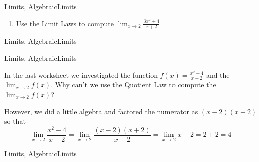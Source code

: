 \begin{tagblock}{Limits, AlgebraicLimits}
\begin{question}
\begin{enumerate}
\vspace{2in}

\item Use the Limit Laws to compute $\displaystyle \lim_{x \to 2} \frac{3x^2+4}{x+2}$  
\end{enumerate}
	
	
\begin{tags}
	    Limits, AlgebraicLimits
\end{tags}
	
\begin{diary}
	    
\end{diary}
	
\begin{solution}
	  
\end{solution}
	
\end{question}

\end{tagblock}



\begin{tagblock}{Limits, AlgebraicLimits}
\begin{question}
	In the last worksheet we investigated the function $\displaystyle f(x) = \frac{x^2-4}{x-2}$ and the $\lim_{x \to 2} f(x)$.  
Why can't we use the Quotient Law to compute the  $\lim_{x \to 2} f(x)$?  

\vspace{1in}

 However, we did a little algebra and factored the numerator as $(x-2)(x+2)$ so that
 \[ \lim_{x \to 2} \frac{x^2-4}{x-2} =  \lim_{x \to 2} \frac{(x-2)(x+2)}{x-2} = \lim_{x \to 2} x+2 = 2+2 = 4 \]
	
	
\begin{tags}
	    Limits, AlgebraicLimits
\end{tags}
	
\begin{diary}
	    
\end{diary}
	
\begin{solution}
	  
\end{solution}
	
\end{question}

\end{tagblock}

